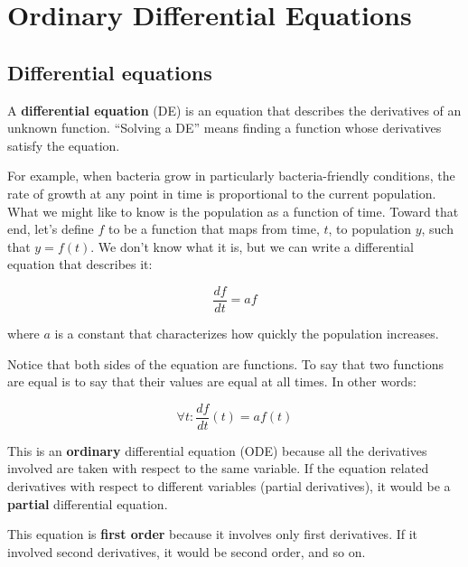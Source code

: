 \documentclass{book}
\begin{document}



\chapter{Ordinary Differential Equations}


\section{Differential equations}

A {\bf differential equation} (DE) is an equation that describes the
derivatives of an unknown function.  ``Solving a DE'' means finding a
function whose derivatives satisfy the equation.

For example, when bacteria grow in particularly bacteria-friendly
conditions, the rate of growth at any point in time is proportional to
the current population.  What we might like to know is the population
as a function of time.  Toward that end, let's define $f$ to be a
function that maps from time, $t$, to population $y$,
such that $y = f(t)$.  We don't
know what it is, but we can write a differential equation
that describes it:

\begin{equation}\label{eq:exp_growth}
\frac{df}{dt} = a f
\end{equation}

where $a$ is a constant that characterizes how quickly the population
increases.

Notice that both sides of the equation are functions.  To say that
two functions are equal is to say that their values are equal at
all times.  In other words:

\begin{equation}
\forall t: \frac{df}{dt}(t) = a f(t)
\end{equation}

This is an {\bf ordinary} differential equation (ODE) because all the
derivatives involved are taken with respect to the
same variable.  If the equation related derivatives with respect to
different variables (partial derivatives), it would be a {\bf partial}
differential equation.

This equation is {\bf first order} because it involves only first
derivatives.  If it involved second derivatives, it would be second order,
and so on.
\end{document}
